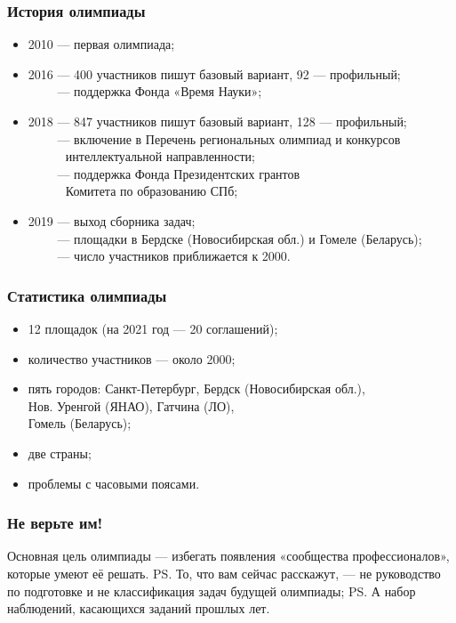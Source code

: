 

\begin{frame}\frametitle{История олимпиады}
\begin{itemize}
	\item 2010 — первая олимпиада;
	\item 2016 — 400 участников пишут базовый вариант, 92 --- профильный;\\
        $\phantom{2016}$ — поддержка Фонда «Время Науки»;
	\item 2018 — 847 участников пишут базовый вариант, 128 --- профильный;\\
        $\phantom{2018}$ — включение в Перечень региональных олимпиад и конкурсов\\
	$\phantom{2018 — }$\quad интеллектуальной направленности;\\
	$\phantom{2018}$ — поддержка Фонда Президентских грантов\\
	$\phantom{2018 — }$\quad Комитета по образованию СПб;\\
	\item 2019 — выход сборника задач;\\
        $\phantom{2019}$ — площадки в Бердске (Новосибирская обл.) и Гомеле (Беларусь);\\
        $\phantom{2019}$ — число участников приближается к 2000.
\end{itemize}\end{frame}

\begin{frame}\frametitle{Статистика олимпиады}
\begin{itemize}
	\item 12 площадок (на 2021 год — 20 соглашений);\\
	\item количество участников --- около 2000;\\
	\item пять городов: Санкт-Петербург, Бердск (Новосибирская обл.), \\
		Нов. Уренгой (ЯНАО), Гатчина (ЛО), \\
		Гомель (Беларусь);\\
	\item две страны;\\
	\item проблемы с часовыми поясами.
\end{itemize}\end{frame}

\begin{frame}\frametitle{Не верьте им!}
	Основная цель олимпиады — избегать появления «сообщества профессионалов», которые умеют её решать. \ps
	То, что вам сейчас расскажут, — не руководство по подготовке и не классификация задач будущей олимпиады; \ps
	А набор наблюдений, касающихся заданий прошлых лет.
\end{frame}
